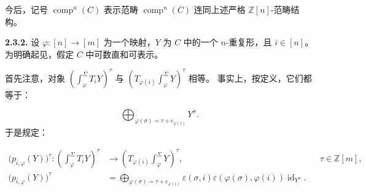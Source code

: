 今后，记号 $\operatorname{comp}^{n}(C)$ 表示范畴
$\operatorname{comp}^{n}(C)$ 连同上述严格 $\mathbb Z[n]$-范畴结构。

\noindent\textbf{2.3.2.}\quad
设 $\varphi\colon[n]\longrightarrow[m]$ 为一个映射，$Y$ 为 $C$ 中的一个
$n$-重复形，且 $i\in[n]$。为明确起见，假定 $C$ 中可数直和可表示。

首先注意，对象
$\left(\int_\varphi^\Sigma T_iY\right)^\tau$ 与
$\left(T_{\varphi(i)}\int_\varphi^\Sigma Y\right)^\tau$ 相等。
事实上，按定义，它们都等于：

\begin{equation*}
  \bigoplus_{\varphi(\sigma)=\tau+e_{\varphi(i)}}Y^\sigma.
\end{equation*}
于是规定：

\begin{equation}
  \begin{aligned}
    \bigl(p_{i,\varphi}(Y)\bigr)^\tau\colon
    \left(\int_\varphi^\Sigma T_iY\right)^\tau
      &\longrightarrow
    \left(T_{\varphi(i)}\int_\varphi^\Sigma Y\right)^\tau,
      &&\tau\in\mathbb Z[m],\\[2pt]
    \bigl(p_{i,\varphi}(Y)\bigr)^\tau
      &=\bigoplus_{\varphi(\sigma)=\tau+e_{\varphi(i)}}
        \varepsilon(\sigma,i)\varepsilon(\varphi(\sigma),\varphi(i))
        \operatorname{id}_{Y^\sigma}.
  \end{aligned}
  \tag{2.3.2.1}
\end{equation}
